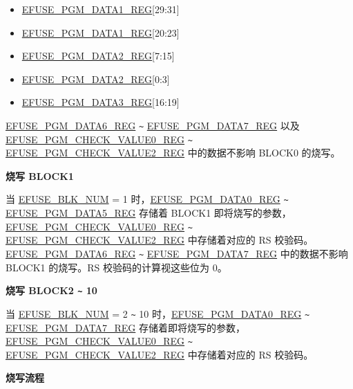\documentclass[main\_\_CN.tex]{subfiles}
\begin{document}
\begin{itemize}
    \item \hyperref[regdesc:EFUSEPGMDATANREG]{EFUSE\_PGM\_DATA1\_REG}[29:31]
    \item \hyperref[regdesc:EFUSEPGMDATANREG]{EFUSE\_PGM\_DATA1\_REG}[20:23]
    \item \hyperref[regdesc:EFUSEPGMDATANREG]{EFUSE\_PGM\_DATA2\_REG}[7:15]
    \item \hyperref[regdesc:EFUSEPGMDATANREG]{EFUSE\_PGM\_DATA2\_REG}[0:3]
    \item \hyperref[regdesc:EFUSEPGMDATANREG]{EFUSE\_PGM\_DATA3\_REG}[16:19]
\end{itemize}


\hyperref[regdesc:EFUSEPGMDATANREG]{EFUSE\_PGM\_DATA6\_REG} \verb+~+ \hyperref[regdesc:EFUSEPGMDATANREG]{EFUSE\_PGM\_DATA7\_REG} 以及 \hyperref[regdesc:EFUSEPGMCHECKVALUENREG]{EFUSE\_PGM\_CHECK\_VALUE0\_REG} \verb+~+ \hyperref[regdesc:EFUSEPGMCHECKVALUENREG]{EFUSE\_PGM\_CHECK\_VALUE2\_REG} 中的数据不影响 BLOCK0 的烧写。

{\bfseries 烧写 BLOCK1}

当 \hyperref[fielddesc:EFUSEBLKNUM]{EFUSE\_BLK\_NUM} = 1 时，\hyperref[regdesc:EFUSEPGMDATANREG]{EFUSE\_PGM\_DATA0\_REG} \verb+~+ \hyperref[regdesc:EFUSEPGMDATANREG]{EFUSE\_PGM\_DATA5\_REG} 存储着 BLOCK1 即将烧写的参数，\hyperref[regdesc:EFUSEPGMCHECKVALUENREG]{EFUSE\_PGM\_CHECK\_VALUE0\_REG} \verb+~+ \hyperref[regdesc:EFUSEPGMCHECKVALUENREG]{EFUSE\_PGM\_CHECK\_VALUE2\_REG} 中存储着对应的 RS 校验码。\hyperref[regdesc:EFUSEPGMDATANREG]{EFUSE\_PGM\_DATA6\_REG} \verb+~+ \hyperref[regdesc:EFUSEPGMDATANREG]{EFUSE\_PGM\_DATA7\_REG} 中的数据不影响 BLOCK1 的烧写。RS 校验码的计算视这些位为 0。

{\bfseries 烧写 BLOCK2 \verb+~+ 10}

当 \hyperref[fielddesc:EFUSEBLKNUM]{EFUSE\_BLK\_NUM} = 2 \verb+~+ 10 时，\hyperref[regdesc:EFUSEPGMDATANREG]{EFUSE\_PGM\_DATA0\_REG} \verb+~+ \hyperref[regdesc:EFUSEPGMDATANREG]{EFUSE\_PGM\_DATA7\_REG} 存储着即将烧写的参数，\hyperref[regdesc:EFUSEPGMCHECKVALUENREG]{EFUSE\_PGM\_CHECK\_VALUE0\_REG}  \verb+~+ \hyperref[regdesc:EFUSEPGMCHECKVALUENREG]{EFUSE\_PGM\_CHECK\_VALUE2\_REG} 中存储着对应的 RS 校验码。

{\bfseries 烧写流程}
\end{document}
